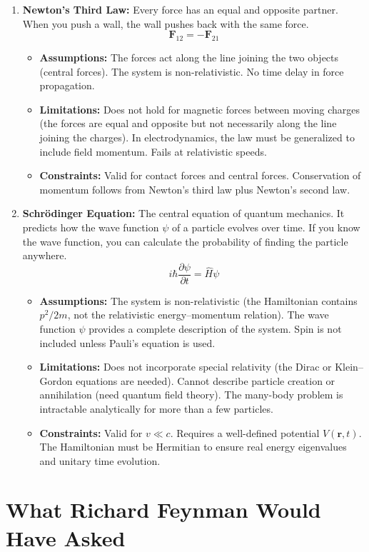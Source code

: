 \documentclass[11pt,openright]{book}
\begin{document}
\begin{enumerate}
\item \textbf{Newton's Third Law:} Every force has an equal and opposite partner. When you push a wall, the wall pushes back with the same force.
\[
\mathbf F_{12}=-\mathbf F_{21}
\]
\begin{itemize}
\item \textbf{Assumptions:} The forces act along the line joining the two objects (central forces). The system is non-relativistic. No time delay in force propagation.
\item \textbf{Limitations:} Does not hold for magnetic forces between moving charges (the forces are equal and opposite but not necessarily along the line joining the charges). In electrodynamics, the law must be generalized to include field momentum. Fails at relativistic speeds.
\item \textbf{Constraints:} Valid for contact forces and central forces. Conservation of momentum follows from Newton's third law plus Newton's second law.
\end{itemize}

\item \textbf{Schr\"odinger Equation:} The central equation of quantum mechanics. It predicts how the wave function $\psi$ of a particle evolves over time. If you know the wave function, you can calculate the probability of finding the particle anywhere.
\[
i\hbar\frac{\partial\psi}{\partial t}=\hat H\psi
\]
\begin{itemize}
\item \textbf{Assumptions:} The system is non-relativistic (the Hamiltonian contains $p^2/2m$, not the relativistic energy--momentum relation). The wave function $\psi$ provides a complete description of the system. Spin is not included unless Pauli's equation is used.
\item \textbf{Limitations:} Does not incorporate special relativity (the Dirac or Klein--Gordon equations are needed). Cannot describe particle creation or annihilation (need quantum field theory). The many-body problem is intractable analytically for more than a few particles.
\item \textbf{Constraints:} Valid for $v\ll c$. Requires a well-defined potential $V(\mathbf r,t)$. The Hamiltonian must be Hermitian to ensure real energy eigenvalues and unitary time evolution.
\end{itemize}

\end{enumerate}

\section*{What Richard Feynman Would Have Asked}
\end{document}
